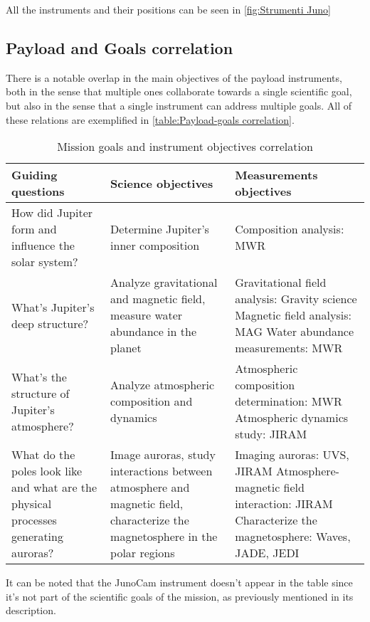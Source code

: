 All the instruments and their positions can be seen in \autoref{fig:Strumenti Juno}

\subsection{Payload and Goals correlation}
There is a notable overlap in the main objectives of the payload instruments, both in the sense that multiple ones collaborate towards a single scientific goal, but also in the sense that a single instrument can address multiple goals. All of these relations are exemplified in \autoref{table:Payload-goals correlation}.

\begin{table}[H]
    \renewcommand{\arraystretch}{1.5}
    \centering
    \begin{tabularx}{\linewidth}{|X|X|X|}
        \hline
        \textbf{Guiding questions} & \textbf{Science objectives} & \textbf{Measurements objectives} \\
        \hline
        \hline
        How did Jupiter form and influence the solar system? & Determine Jupiter's inner composition & Composition analysis: MWR \\ 
        \hline
        What's Jupiter's deep structure? & Analyze gravitational and magnetic field, measure water abundance in the planet & Gravitational field analysis: Gravity science \newline Magnetic field analysis: MAG \newline Water abundance measurements: MWR \\
        \hline
        What's the structure of Jupiter's atmosphere? & Analyze atmospheric composition and dynamics  & Atmospheric composition determination: MWR \newline Atmospheric dynamics study: JIRAM \\
        \hline
        What do the poles look like and what are the physical processes generating auroras? & Image auroras, study interactions between atmosphere and magnetic field, characterize the magnetosphere in the polar regions & Imaging auroras: UVS, JIRAM \newline Atmosphere-magnetic field interaction: JIRAM \newline Characterize the magnetosphere: Waves, JADE, JEDI \\
        \hline
    \end{tabularx}
    \caption{Mission goals and instrument objectives correlation}
    \label{table:Payload-goals correlation}
\end{table}
It can be noted that the JunoCam instrument doesn't appear in the table since it's not part of the scientific goals of the mission, as previously mentioned in its description.

